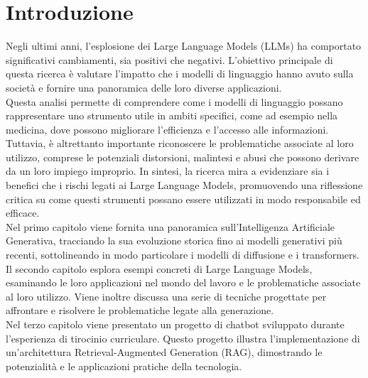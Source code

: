 \chapter*{Introduzione} %
Negli ultimi anni, l'esplosione dei Large Language Models (LLMs) ha comportato significativi cambiamenti, sia positivi che negativi. L'obiettivo principale di questa ricerca è valutare l'impatto che i modelli di linguaggio hanno avuto sulla società e fornire una panoramica delle loro diverse applicazioni.\\
Questa analisi permette di comprendere come i modelli di linguaggio possano rappresentare uno strumento utile in ambiti specifici, come ad esempio nella medicina, dove possono migliorare l'efficienza e l'accesso alle informazioni. Tuttavia, è altrettanto importante riconoscere le problematiche associate al loro utilizzo, comprese le potenziali distorsioni, malintesi e abusi che possono derivare da un loro impiego improprio.
In sintesi, la ricerca mira a evidenziare sia i benefici che i rischi legati ai Large Language Models, promuovendo una riflessione critica su come questi strumenti possano essere utilizzati in modo responsabile ed efficace.\\
Nel primo capitolo viene fornita una panoramica sull'Intelligenza Artificiale Generativa, tracciando la sua evoluzione storica fino ai modelli generativi più recenti, sottolineando in modo particolare i modelli di diffusione e i transformers.\\
Il secondo capitolo esplora esempi concreti di Large Language Models, esaminando le loro applicazioni nel mondo del lavoro e le problematiche associate al loro utilizzo. Viene inoltre discussa una serie di tecniche progettate per affrontare e risolvere le problematiche legate alla generazione.\\
Nel terzo capitolo viene presentato un progetto di chatbot sviluppato durante l'esperienza di tirocinio curriculare. Questo progetto illustra l'implementazione di un'architettura Retrieval-Augmented Generation (RAG), dimostrando le potenzialità e le applicazioni pratiche della tecnologia.
